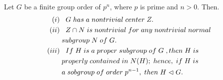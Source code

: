 \begin{teo}
    Let $G$ be a finite group order of $p^n$, where $p$ is prime and $n>0$. Then.
    \begin{align*}
        (i)&\hspace{.3cm}G\hspace{.1cm}has\hspace{.1cm}a\hspace{.1cm}nontrivial\hspace{.1cm}center\hspace{.1cm}Z.\\
        (ii)&\hspace{.3cm}Z\cap N\hspace{.1cm}is\hspace{.1cm}nontrivial\hspace{.1cm}for\hspace{.1cm}any\hspace{.1cm}nontrivial\hspace{.1cm}normal\\
        &\hspace{.1cm}subgroup\hspace{.1cm}N\hspace{.1cm}of\hspace{.1cm}G.\\
        (iii)&\hspace{.3cm}If\hspace{.1cm}H\hspace{.1cm}is\hspace{.1cm}a\hspace{.1cm}proper\hspace{.1cm}subgroup\hspace{.1cm}of\hspace{.1cm}G\hspace{.1cm},then\hspace{.1cm}H\hspace{.1cm}is\\
        &\hspace{.1cm}properly\hspace{.1cm}contained\hspace{.1cm}in\hspace{.1cm}N(H);\hspace{.1cm}hence,\hspace{.1cm}if\hspace{.1cm}H\hspace{.1cm}is\\
        &\hspace{.1cm}a\hspace{.1cm}sobgroup\hspace{.1cm}of\hspace{.1cm}order\hspace{.1cm}p^{n-1},\hspace{.1cm}then\hspace{.1cm}H\vartriangleleft G.
    \end{align*}
\end{teo}
